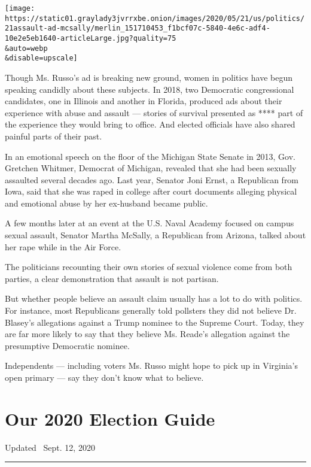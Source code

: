 \texttt{[image: https://static01.graylady3jvrrxbe.onion/images/2020/05/21/us/politics/21assault-ad-mcsally/merlin\_151710453\_f1bcf07c-5840-4e6c-adf4-10e2e5eb1640-articleLarge.jpg?quality=75\\\&auto=webp\\\&disable=upscale]}

Though Ms. Russo's ad is breaking new ground, women in politics have
begun speaking candidly about these subjects. In 2018, two Democratic
congressional candidates, one in Illinois and another in Florida,
produced ads about their experience with abuse and assault --- stories
of survival presented as **** part of the experience they would bring to
office. And elected officials have also shared painful parts of their
past.

In an emotional speech on the floor of the Michigan State Senate in
2013, Gov. Gretchen Whitmer, Democrat of Michigan, revealed that she had
been sexually assaulted several decades ago. Last year, Senator Joni
Ernst, a Republican from Iowa, said that she was raped in college after
court documents alleging physical and emotional abuse by her ex-husband
became public.

A few months later at an event at the U.S. Naval Academy focused on
campus sexual assault, Senator Martha McSally, a Republican from
Arizona, talked about her rape while in the Air Force.

The politicians recounting their own stories of sexual violence come
from both parties, a clear demonstration that assault is not partisan.

But whether people believe an assault claim usually has a lot to do with
politics. For instance, most Republicans generally told pollsters they
did not believe Dr. Blasey's allegations against a Trump nominee to the
Supreme Court. Today, they are far more likely to say that they believe
Ms. Reade's allegation against the presumptive Democratic nominee.

Independents --- including voters Ms. Russo might hope to pick up in
Virginia's open primary --- say they don't know what to believe.

\hypertarget{our-2020-election-guide}{%
\section{Our 2020 Election Guide}\label{our-2020-election-guide}}

Updated ~Sept. 12, 2020

\begin{center}\rule{0.5\linewidth}{\linethickness}\end{center}

